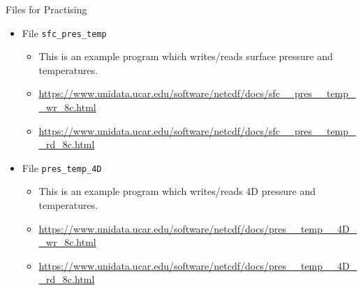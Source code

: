 \documentclass[compress,11pt,xcolor=svgnames,aspectratio=169]{beamer}
\begin{document}
\begin{frame}[fragile]{Files for Practising}

\begin{itemize}
\setlength\itemsep{0.4cm}

  \item File \verb|sfc_pres_temp|\\[0.3cm]
    \begin{itemize}
    \setlength\itemsep{0.2cm}
      \item {\footnotesize This is an example program which writes/reads surface pressure and temperatures.}
      \item {\scriptsize \url{https://www.unidata.ucar.edu/software/netcdf/docs/sfc__pres__temp__wr_8c.html}}
      \item {\scriptsize \url{https://www.unidata.ucar.edu/software/netcdf/docs/sfc__pres__temp__rd_8c.html}}
    \end{itemize}

  \item File \verb|pres_temp_4D|\\[0.3cm]
    \begin{itemize}
    \setlength\itemsep{0.2cm}
      \item {\footnotesize This is an example program which writes/reads 4D pressure and temperatures.}
      \item {\scriptsize \url{https://www.unidata.ucar.edu/software/netcdf/docs/pres__temp__4D__wr_8c.html}}
      \item {\scriptsize \url{https://www.unidata.ucar.edu/software/netcdf/docs/pres__temp__4D__rd_8c.html}}
    \end{itemize}

\end{itemize}

\end{frame}
\end{document}
